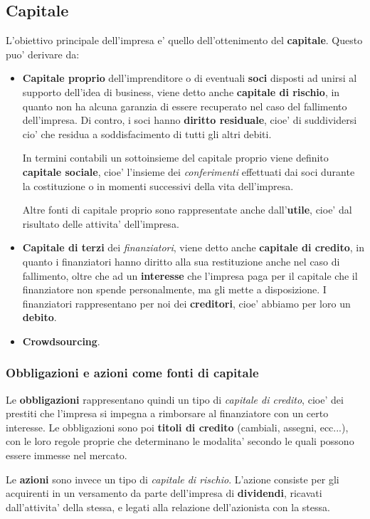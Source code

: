 \documentclass[a4paper,11pt]{article}
\begin{document}
\subsection{Capitale}
L'obiettivo principale dell'impresa e' quello dell'ottenimento del \textbf{capitale}.
Questo puo' derivare da:
\begin{itemize}
	\item \textbf{Capitale proprio} dell'imprenditore o di eventuali \textbf{soci} disposti ad unirsi al supporto dell'idea di business, viene detto anche \textbf{capitale di rischio}, in quanto non ha alcuna garanzia di essere recuperato nel caso del fallimento dell'impresa. Di contro, i soci hanno \textbf{diritto residuale}, cioe' di suddividersi cio' che residua a soddisfacimento di tutti gli altri debiti.

		In termini contabili un sottoinsieme del capitale proprio viene definito \textbf{capitale sociale}, cioe' l'insieme dei \textit{conferimenti} effettuati dai soci durante la costituzione o in momenti successivi della vita dell'impresa.

		Altre fonti di capitale proprio sono rappresentate anche dall'\textbf{utile}, cioe' dal risultato delle attivita' dell'impresa.
	\item \textbf{Capitale di terzi} dei \textit{finanziatori}, viene detto anche \textbf{capitale di credito}, in quanto i finanziatori hanno diritto alla sua restituzione anche nel caso di fallimento, oltre che ad un \textbf{interesse} che l'impresa paga per il capitale che il finanziatore non spende personalmente, ma gli mette a disposizione.
		I finanziatori rappresentano per noi dei \textbf{creditori}, cioe' abbiamo per loro un \textbf{debito}.
	\item \textbf{Crowdsourcing}.
\end{itemize}

\subsubsection{Obbligazioni e azioni come fonti di capitale}

Le \textbf{obbligazioni} rappresentano quindi un tipo di \textit{capitale di credito}, cioe' dei prestiti che l'impresa si impegna a rimborsare al finanziatore con un certo interesse.
Le obbligazioni sono poi \textbf{titoli di credito} (cambiali, assegni, ecc...), con le loro regole proprie che determinano le modalita' secondo le quali possono essere immesse nel mercato.

Le \textbf{azioni} sono invece un tipo di \textit{capitale di rischio}.
L'azione consiste per gli acquirenti in un versamento da parte dell'impresa di \textbf{dividendi}, ricavati dall'attivita' della stessa, e legati alla relazione dell'azionista con la stessa.
\end{document}
